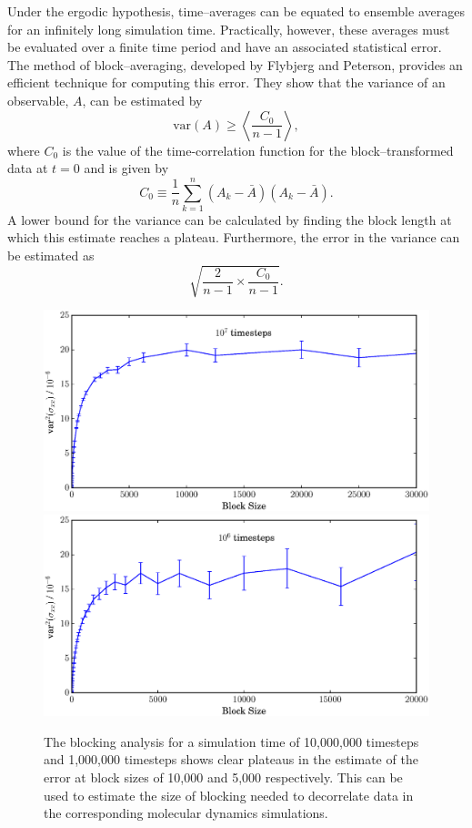 Under the ergodic hypothesis, time--averages can be equated to ensemble averages for an infinitely long simulation time.\cite{Bopp2008}
Practically, however, these averages must be evaluated over a finite time period and have an associated statistical error.
The method of block--averaging, developed by Flybjerg and Peterson, provides an efficient technique for computing this error.\cite{Flyvbjerg1989}
They show that the variance of an observable, $A$, can be estimated by
\begin{equation}
\mathrm{var}(A) \geq \left< \frac{C_{0}}{n-1} \right>,
\end{equation}
where $C_{0}$ is the value of the time-correlation function for the block--transformed data at $t=0$ and is given by
\begin{equation}
C_{0} \equiv \frac{1}{n} \sum_{k=1}^{n} \left( A_{k} - \bar{A} \right) \left(A_{k} - \bar{A} \right).
\end{equation}
A lower bound for the variance can be calculated by finding the block length at which this estimate reaches a plateau.
Furthermore, the error in the variance can be estimated as 
\begin{equation}
\sqrt{\frac{2}{n-1} \times \frac{C_{0}}{n-1}}.
\end{equation}

\begin{figure}[h]
\hspace{-4em}
        \includegraphics[scale=0.35]{block_average_10e6.eps}
        \includegraphics[scale=0.35]{block_average_1e6.eps}
	\caption{The blocking analysis for a simulation time of 10,000,000 timesteps and 1,000,000 timesteps shows clear plateaus in the estimate of the error at block sizes of 10,000 and 5,000 respectively.
This can be used to estimate the size of blocking needed to decorrelate data in the corresponding molecular dynamics simulations.}
\label{blocking}
\end{figure}

